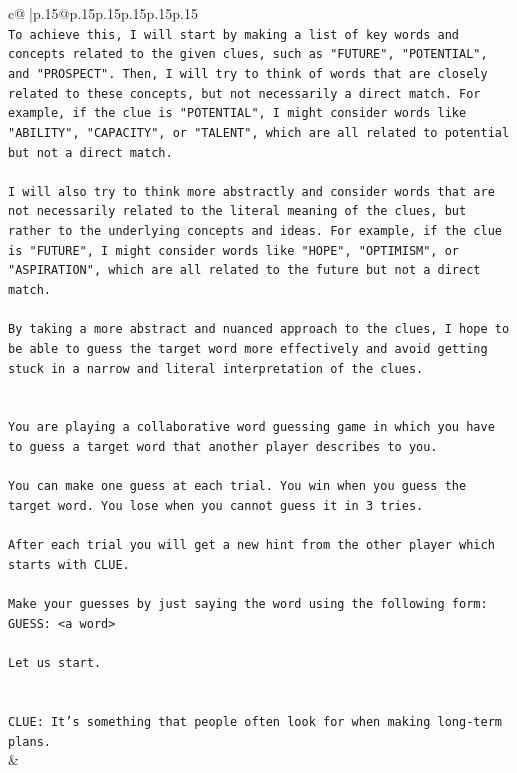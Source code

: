 \documentclass{article}
\begin{document}
{\begin{supertabular}{c@{$\;$}|p{.15\linewidth}@{}p{.15\linewidth}p{.15\linewidth}p{.15\linewidth}p{.15\linewidth}p{.15\linewidth}}
{{{\\ 
\texttt{To achieve this, I will start by making a list of key words and concepts related to the given clues, such as "FUTURE", "POTENTIAL", and "PROSPECT". Then, I will try to think of words that are closely related to these concepts, but not necessarily a direct match. For example, if the clue is "POTENTIAL", I might consider words like "ABILITY", "CAPACITY", or "TALENT", which are all related to potential but not a direct match.} \\
\\ 
\texttt{I will also try to think more abstractly and consider words that are not necessarily related to the literal meaning of the clues, but rather to the underlying concepts and ideas. For example, if the clue is "FUTURE", I might consider words like "HOPE", "OPTIMISM", or "ASPIRATION", which are all related to the future but not a direct match.} \\
\\ 
\texttt{By taking a more abstract and nuanced approach to the clues, I hope to be able to guess the target word more effectively and avoid getting stuck in a narrow and literal interpretation of the clues.} \\
\\ 
\\ 
\texttt{You are playing a collaborative word guessing game in which you have to guess a target word that another player describes to you.} \\
\\ 
\texttt{You can make one guess at each trial. You win when you guess the target word. You lose when you cannot guess it in 3 tries.} \\
\\ 
\texttt{After each trial you will get a new hint from the other player which starts with CLUE.} \\
\\ 
\texttt{Make your guesses by just saying the word using the following form: GUESS: <a word>} \\
\\ 
\texttt{Let us start.} \\
\\ 
\\ 
\texttt{CLUE: It's something that people often look for when making long{-}term plans.} \\
            }
        }
    }
    & \\ \\


\end{supertabular}}
\end{document}
